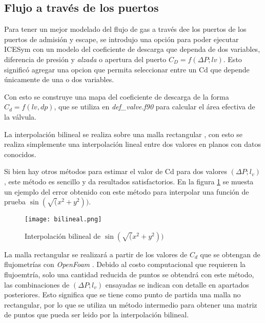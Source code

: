 \subsection{Flujo a través de los puertos}
%
Para tener un mejor modelado del flujo de gas a través dee los puertos de los
puertos de admisión y escape, se introdujo una opción para poder ejecutar
ICESym con un modelo del coeficiente de descarga que dependa de dos variables,
diferencia de presión y \emph{alzada} o apertura del puerto $C_D = f(\Delta P;
lv)$.
%
Esto significó agregar una opcion que permita seleccionar entre un Cd que
depende únicamente de una o dos variables.

Con esto se construye una mapa del coeficiente de descarga de la forma $C_d =
f(lv, dp)$, que se utiliza en \emph{def\_valve.f90} para calcular el área
efectiva de la válvula.

La interpolación bilineal se realiza sobre una malla rectangular , con esto se
realiza simplemente una interpolación lineal entre dos valores en planos con
datos conocidos.


Si bien hay otros métodos para estimar el valor de Cd para dos valores $(\Delta
P; l_v)$, este método es sencillo y da resultados satisfactorios.
%
En la figura \ref{fig:bilineal} se muesta un ejemplo del error obtenido
con este método para interpolar una función de prueba 
$\sin(\sqrt(x^2 + y^2))$.

\begin{figure}
    \centering
    \texttt{[image: bilineal.png]}
    \caption{Interpolación bilineal de $\sin(\sqrt(x^2 + y^2))$}
    \label{fig:bilineal}
\end{figure}

La malla rectangular se realizará a partir de los valores de $C_d$ que se
obtengan de flujometrías con \emph{OpenFoam} \cite{openfoam}.
%
Debido al costo computacional que requieren la flujoemtría, solo una cantidad
reducida de puntos se obtendrá con este método, las combinaciones de $(\Delta
P; l_v)$ ensayadas se indican con detalle en apartados posteriores.
%
Esto significa que se tiene como punto de partida una malla no rectangular, por
lo que se utiliza un método intermedio para obtener una matriz de puntos que
pueda ser leido por la interpolación bilineal.

